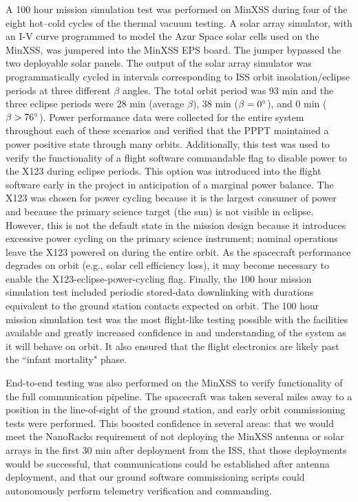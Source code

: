 A 100 hour mission simulation test was performed on MinXSS during four of the eight hot–cold cycles of the thermal vacuum testing. A solar array simulator, with an I-V curve programmed to model the Azur Space solar cells used on the MinXSS, was jumpered into the MinXSS EPS board. The jumper bypassed the two deployable solar panels. The output of the solar array simulator was programmatically cycled in intervals corresponding to ISS orbit insolation/eclipse periods at three different $\beta$ angles. The total orbit period was 93 min and the three eclipse periods were 28 min (average $\beta$), 38 min ($\beta = 0\degree$), and 0 min ($\beta > 76\degree$). Power performance data were collected for the entire system throughout each of these scenarios and verified that the PPPT maintained a power positive state through many orbits. Additionally, this test was used to verify the functionality of a flight software commandable flag to disable power to the X123 during eclipse periods. This option was introduced into the flight software early in the project in anticipation of a marginal power balance. The X123 was chosen for power cycling because it is the largest consumer of power and because the primary science target (the sun) is not visible in eclipse. However, this is not the default state in the mission design because it introduces excessive power cycling on the primary science instrument; nominal operations leave the X123 powered on during the entire orbit. As the spacecraft performance degrades on orbit (e.g., solar cell efficiency loss), it may become necessary to enable the X123-eclipse-power-cycling flag. Finally, the 100 hour mission simulation test included periodic stored-data downlinking with durations equivalent to the ground station contacts expected on orbit. The 100 hour mission simulation test was the most flight-like testing possible with the facilities available and greatly increased confidence in and understanding of the system as it will behave on orbit. It also ensured that the flight electronics are likely past the ``infant mortality" phase.

End-to-end testing was also performed on the MinXSS to verify functionality of the full communication pipeline. The spacecraft was taken several miles away to a position in the line-of-sight of the ground station, and early orbit commissioning tests were performed. This boosted confidence in several areas: that we would meet the NanoRacks requirement of not deploying the MinXSS antenna or solar arrays in the first 30 min after deployment from the ISS, that those deployments would be successful, that communications could be established after antenna deployment, and that our ground software commissioning scripts could autonomously perform telemetry verification and commanding.

